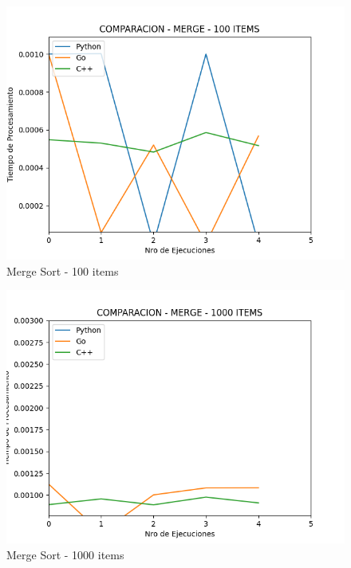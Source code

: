 \documentclass[12pt]{article} %
\begin{document}
\begin{figure}[H]
    \centering
    \includegraphics[width=\textwidth]{merge_100}
    \caption{Merge Sort - 100 items}
    \end{figure}
    
    \vspace{5mm}
    
    \begin{figure}[H]
    \centering
    \includegraphics[width=\textwidth]{merge_1000}
    \caption{Merge Sort - 1000 items}
    \end{figure}
    
    \vspace{5mm}
    
\end{document}
